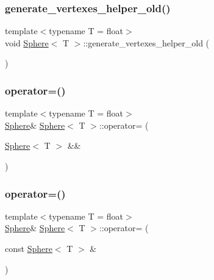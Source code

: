\subsubsection{\texorpdfstring{generate\+\_\+vertexes\+\_\+helper\+\_\+old()}{generate\_vertexes\_helper\_old()}}
{\footnotesize\ttfamily template$<$typename T  = float$>$ \\
void \mbox{\hyperlink{classSphere}{Sphere}}$<$ T $>$\+::generate\+\_\+vertexes\+\_\+helper\+\_\+old (\begin{DoxyParamCaption}{ }\end{DoxyParamCaption})\hspace{0.3cm}{\ttfamily [private]}}

\mbox{\label{classSphere_aa117f966cea7b16532cbd80c2191a84a}} 
\subsubsection{\texorpdfstring{operator=()}{operator=()}\hspace{0.1cm}{\footnotesize\ttfamily [1/2]}}
{\footnotesize\ttfamily template$<$typename T  = float$>$ \\
\mbox{\hyperlink{classSphere}{Sphere}}\& \mbox{\hyperlink{classSphere}{Sphere}}$<$ T $>$\+::operator= (\begin{DoxyParamCaption}\item[{\mbox{\hyperlink{classSphere}{Sphere}}$<$ T $>$ \&\&}]{ }\end{DoxyParamCaption})\hspace{0.3cm}{\ttfamily [default]}}

\mbox{\label{classSphere_ae989d05c3ea71f5a758e90e2f2e3aecf}} 
\subsubsection{\texorpdfstring{operator=()}{operator=()}\hspace{0.1cm}{\footnotesize\ttfamily [2/2]}}
{\footnotesize\ttfamily template$<$typename T  = float$>$ \\
\mbox{\hyperlink{classSphere}{Sphere}}\& \mbox{\hyperlink{classSphere}{Sphere}}$<$ T $>$\+::operator= (\begin{DoxyParamCaption}\item[{const \mbox{\hyperlink{classSphere}{Sphere}}$<$ T $>$ \&}]{ }\end{DoxyParamCaption})\hspace{0.3cm}{\ttfamily [default]}}

